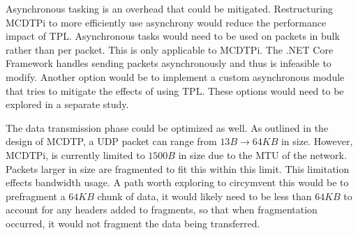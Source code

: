 Asynchronous tasking is an overhead that could be mitigated. Restructuring MCDTPi to more efficiently use asynchrony would reduce the performance impact of TPL. Asynchronous tasks would need to be used on packets in bulk rather than per packet. This is only applicable to MCDTPi. The .NET Core Framework handles sending packets asynchronously and thus is infeasible to modify. Another option would be to implement a custom asynchronous module that tries to mitigate the effects of using TPL. These options would need to be explored in a separate study.

The data transmission phase could be optimized as well. As outlined in the design of MCDTP, a UDP packet can range from $13B \rightarrow 64KB$ in size. However, MCDTPi, is currently limited to $1500B$ in size due to the MTU of the network. Packets larger in size are fragmented to fit this within this limit. This limitation effects bandwidth usage. A path worth exploring to circymvent this would be to prefragment a $64KB$ chunk of data, it would likely need to be less than $64KB$ to account for any headers added to fragments, so that when fragmentation occurred, it would not fragment the data being transferred.
